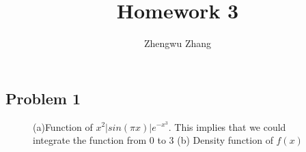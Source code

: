 \documentclass[12pt] {article}
\author{Zhengwu Zhang}
\title{Homework 3}
\begin{document}
 
\maketitle
\newpage
\subsection{Problem 1}

\begin{figure}
\begin{center}
\caption{(a)Function of $x^2|sin(\pi x)|e^{-x^3}$. This implies that we could integrate the function from 0 to 3 (b) Density function of $f(x)$}

\end{center}
\end{figure}
\end{document}
